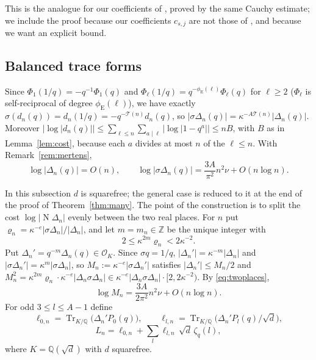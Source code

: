 \documentclass[11pt]{amsart}
\theoremstyle{definition}
\theoremstyle{remark}
\numberwithin{equation}{section}
\newcommand{\ZZ}{\mathbb{Z}}
\newcommand{\QQ}{\mathbb{Q}}
\newcommand{\cO}{\mathcal{O}}
\newcommand{\Nm}{\operatorname{N}}
\newcommand{\eu}{\phi_{\mathrm E}}
\newcommand{\Tot}{\mathcal T}
\begin{document}
This is the analogue for our coefficients of \cite[Lemma~5]{KRZ06}, proved by the same Cauchy estimate; we include the proof
because our coefficients $c_{s,j}$ are not those of \cite{KRZ06}, and because we want an explicit bound.

\subsection*{Balanced trace forms}

Since $\Phi_1(1/q)=-q^{-1}\Phi_1(q)$ and $\Phi_\ell(1/q)=q^{-\eu(\ell)}\Phi_\ell(q)$ for $\ell\ge2$ ($\Phi_\ell$ is
self-reciprocal of degree $\eu(\ell)$), we have exactly $\sigma(d_n(q))=d_n(1/q)=-q^{-\Tot(n)}d_n(q)$, so
$|\sigma\Delta_n(q)|=\kappa^{-A\Tot(n)}|\Delta_n(q)|$. Moreover $|\log|d_n(q)||\le\sum_{\ell\le n}\sum_{a\mid\ell}
|\log|1-q^a||\le nB$, with $B$ as in Lemma~\ref{lem:cost}, because each $a$ divides at most $n$ of the $\ell\le n$.
With Remark~\ref{rem:mertens},
\begin{equation}\label{eq:twoplaces}
\log|\Delta_n(q)|=O(n),\qquad\log|\sigma\Delta_n(q)|=\frac{3A}{\pi^2}n^2\nu+O(n\log n).
\end{equation}

In this subsection $d$ is squarefree; the general case is reduced to it at the end of the proof of Theorem~\ref{thm:many}. The point of the construction is to split the cost $\log|\Nm\Delta_n|$ evenly between the two real places. For
$n$ put $\varrho_n=\kappa^{-e}|\sigma\Delta_n|/|\Delta_n|$, and let $m=m_n\in\ZZ$ be the unique integer with
\begin{equation}\label{eq:balance}
2\le\kappa^{2m}\varrho_n<2\kappa^{-2}.
\end{equation}
Put $\Delta_n'=q^{-m}\Delta_n(q)\in\cO_K$. Since $\sigma q=1/q$, $|\Delta_n'|=\kappa^{-m}|\Delta_n|$ and
$|\sigma\Delta_n'|=\kappa^m|\sigma\Delta_n|$, so $M_n:=\kappa^{-e}|\sigma\Delta_n'|$ satisfies $|\Delta_n'|\le M_n/2$
and $M_n^2=\kappa^{2m}\varrho_n\cdot\kappa^{-e}|\Delta_n\sigma\Delta_n|\in\kappa^{-e}|\Delta_n\sigma\Delta_n|\cdot
[2,2\kappa^{-2})$. By \eqref{eq:twoplaces},
\begin{equation}\label{eq:Mn}
\log M_n=\frac{3A}{2\pi^2}n^2\nu+O(n\log n).
\end{equation}
For odd $3\le l\le A-1$ define
\[
\ell_{0,n}=\operatorname{Tr}_{K/\QQ}\bigl(\Delta_n'P_0(q)\bigr),\qquad
\ell_{l,n}=\operatorname{Tr}_{K/\QQ}\bigl(\Delta_n'P_l(q)/\sqrt d\bigr),
\]
\[
L_n=\ell_{0,n}+\sum_l\ell_{l,n}\,\sqrt d\,\zeta_q(l),
\]
where $K=\QQ(\sqrt d)$ with $d$ squarefree.
\end{document}
